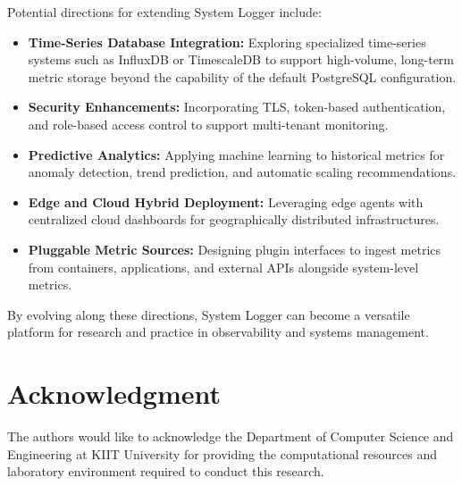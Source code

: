 \documentclass[conference]{IEEEtran}
\begin{document}
Potential directions for extending System Logger include:
\begin{itemize}
  \item \textbf{Time-Series Database Integration:} Exploring specialized time-series systems such as InfluxDB or TimescaleDB to support high-volume, long-term metric storage beyond the capability of the default PostgreSQL configuration.
  \item \textbf{Security Enhancements:} Incorporating TLS, token-based authentication, and role-based access control to support multi-tenant monitoring.
  \item \textbf{Predictive Analytics:} Applying machine learning to historical metrics for anomaly detection, trend prediction, and automatic scaling recommendations.
  \item \textbf{Edge and Cloud Hybrid Deployment:} Leveraging edge agents with centralized cloud dashboards for geographically distributed infrastructures.
  \item \textbf{Pluggable Metric Sources:} Designing plugin interfaces to ingest metrics from containers, applications, and external APIs alongside system-level metrics.
\end{itemize}

By evolving along these directions, System Logger can become a versatile platform for research and practice in observability and systems management.

\section*{Acknowledgment}

The authors would like to acknowledge the Department of Computer Science and Engineering at KIIT University for providing the computational resources and laboratory environment required to conduct this research.
\end{document}
